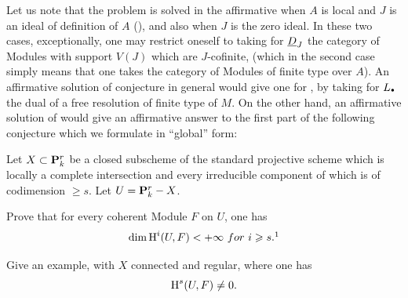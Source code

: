 Let us note that the problem is solved in the affirmative when $A$ is local and $J$ is an ideal of definition of $A$ (\cf \Exp {}), and also when $J$ is the zero ideal. In these two cases, exceptionally, one may restrict oneself to taking for ${\underline{D}_J}$ the category of Modules with support $V(J)$ which are $J$-cofinite, (which in the second case simply means that one takes the category of Modules of finite type over $A$). An affirmative solution of conjecture  in general would give one for , by taking for $L_{\boule}$ the dual of a free resolution of finite type of $M$. On the other hand, an affirmative solution of  would give an affirmative answer to the first part of the following conjecture which we formulate in ``global'' form:

\begin{conjecture} \label{XIII.1.3}
Let $X\subset {\mathbf P}^r_k$ be a closed subscheme of the standard projective scheme which is locally a complete intersection and every irreducible component of which is of codimension $\ge s$. Let $U={\mathbf P}^r_k -X$.
\begin{enumeratei}
\item
Prove that for every coherent Module $F$ on $U$, one has
$$
\dim \H^i(U, F)<+\infty{\rm \ for\ } i\ge s.{}\sfootnote{Part (i) of this conjecture is proved by R.~Hartshorne when $X$ is smooth \cf \emph{Ample subvarieties of algebraic varieties}, Notes written in collaboration with C\ptbl Musili, Lect. Notes in Math, vol.~156, Springer-Verlag, Berlin-New York, 1970, theorem III.5.2. This author has also found an example for (ii), \cf R.~Hartshorne, ``Cohomological dimension of algebraic varieties'', \emph{Ann. of Math. (2)} \textbf{88} (1968), p\ptbl 403--450, example page 449.}
$$

\item
Give an example, with $X$ connected and regular, where one has
$$
\operatorname{H}^s(U, F)\neq 0.
$$
\end{enumeratei}
\end{conjecture}

